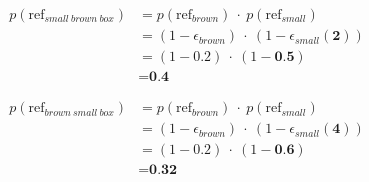 \documentclass[preprint,authoryear]{elsarticle}\frenchspacing
\begin{document}
\begin{align} \label{small-brown-ref}
p(\textrm{ref}_{small\ brown\ box}) &= p(\textrm{ref}_{brown})\ \cdot\ p(\textrm{ref}_{small}) \nonumber\\
&= (1 - \epsilon_{brown})\ \cdot\ (1 - \epsilon_{small}(\textbf{2})) \nonumber\\
&= (1 - 0.2)\ \cdot\ (1 - \textbf{0.5}) \nonumber\\
&= \textbf{0.4}
\end{align}

\begin{align} \label{brown-small-ref}
p(\textrm{ref}_{brown\ small\ box}) &= p(\textrm{ref}_{brown})\ \cdot\ p(\textrm{ref}_{small}) \nonumber\\
&= (1 - \epsilon_{brown})\ \cdot\ (1 - \epsilon_{small}(\textbf{4})) \nonumber\\
&= (1 - 0.2)\ \cdot\ (1 - \textbf{0.6}) \nonumber\\
&= \textbf{0.32}
\end{align}

\end{document}
